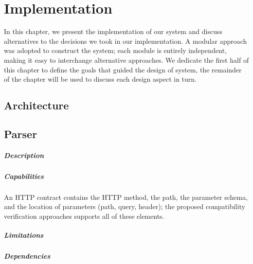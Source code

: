 
%

\chapter{Implementation}
\label{cha:implementation}

In this chapter, we present the implementation of our system and discuss alternatives to the decisions we took in our implementation.
A modular approach was adopted to construct the system;
each module is entirely independent, making it easy to interchange alternative approaches.
We dedicate the first half of this chapter to define the goals that guided the design of system,
the remainder of the chapter will be used to discuss each design aspect in turn.

\section{Architecture} %
\label{sec:architecture}

\section{Parser} %
\label{sec:parser}

\paragraph{Description}
\paragraph{Capabilities}
An HTTP contract contains the HTTP method, the
path, the parameter schema, and the location of parameters (path, query, header); the
proposed compatibility verification approaches supports all of these elements.
\paragraph{Limitations}
\paragraph{Dependencies}

